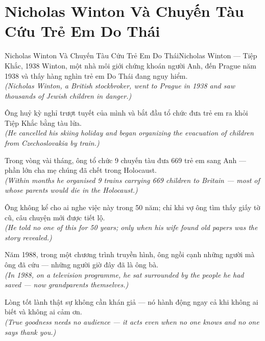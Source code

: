 \section{Nicholas Winton Và Chuyến Tàu Cứu Trẻ Em Do Thái}
\begin{truyen}{Nicholas Winton Và Chuyến Tàu Cứu Trẻ Em Do Thái}{Nicholas Winton --- Tiệp Khắc, 1938}
 Winton, một nhà môi giới chứng khoán người Anh, đến Prague năm 1938 và thấy hàng nghìn trẻ em Do Thái đang nguy hiểm.\\[4pt]
\textit{(Nicholas Winton, a British stockbroker, went to Prague in 1938 and saw thousands of Jewish children in danger.)}

Ông huỷ kỳ nghỉ trượt tuyết của mình và bắt đầu tổ chức đưa trẻ em ra khỏi Tiệp Khắc bằng tàu lửa.\\[4pt]
\textit{(He cancelled his skiing holiday and began organizing the evacuation of children from Czechoslovakia by train.)}

Trong vòng vài tháng, ông tổ chức 9 chuyến tàu đưa 669 trẻ em sang Anh --- phần lớn cha mẹ chúng đã chết trong Holocaust.\\[4pt]
\textit{(Within months he organised 9 trains carrying 669 children to Britain --- most of whose parents would die in the Holocaust.)}

Ông không kể cho ai nghe việc này trong 50 năm; chỉ khi vợ ông tìm thấy giấy tờ cũ, câu chuyện mới được tiết lộ.\\[4pt]
\textit{(He told no one of this for 50 years; only when his wife found old papers was the story revealed.)}

Năm 1988, trong một chương trình truyền hình, ông ngồi cạnh những người mà ông đã cứu --- những người giờ đây đã là ông bà.\\[4pt]
\textit{(In 1988, on a television programme, he sat surrounded by the people he had saved --- now grandparents themselves.)}

\end{truyen}
\begin{baihoc}
  Lòng tốt lành thật sự không cần khán giả --- nó hành động ngay cả khi không ai biết và không ai cảm ơn.\\[4pt]
  \textit{(True goodness needs no audience --- it acts even when no one knows and no one says thank you.)}
\end{baihoc}

